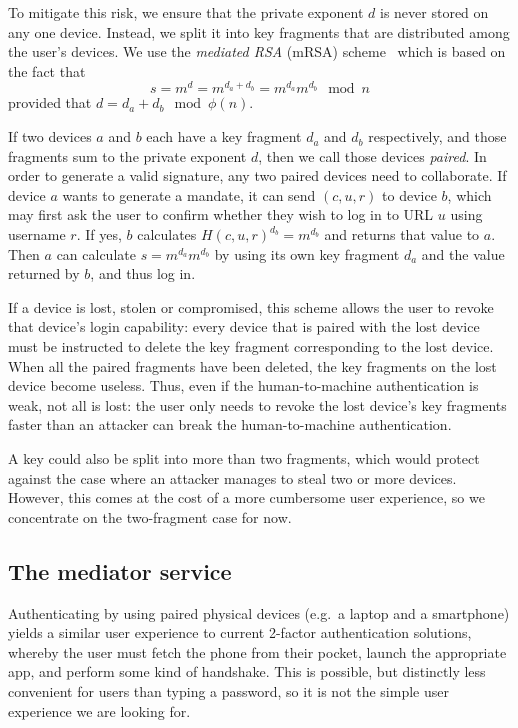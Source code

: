 To mitigate this risk, we ensure that the private exponent $d$ is never stored on any one device.
Instead, we split it into key fragments that are distributed among the user's devices. We use the
\emph{mediated RSA} (mRSA) scheme~\cite{Boneh01, Kutyiowski12} which is based on the fact that
$$s = m^d = m^{d_a + d_b} = m^{d_a} m^{d_b} \mod n$$ provided that $d = d_a + d_b \mod \phi(n)$.

If two devices $a$ and $b$ each have a key fragment $d_a$ and $d_b$ respectively, and those
fragments sum to the private exponent $d$, then we call those devices \emph{paired}. In order to
generate a valid signature, any two paired devices need to collaborate. If device $a$ wants to
generate a mandate, it can send $(c, u, r)$ to device $b$, which may first ask the user to confirm
whether they wish to log in to URL $u$ using username $r$. If yes, $b$ calculates
$H(c, u, r)^{d_b} = m^{d_b}$ and returns that value to $a$. Then $a$ can calculate
$s = m^{d_a} m^{d_b}$ by using its own key fragment $d_a$ and the value returned by $b$, and thus
log in.

If a device is lost, stolen or compromised, this scheme allows the user to revoke that device's
login capability: every device that is paired with the lost device must be instructed to delete the
key fragment corresponding to the lost device. When all the paired fragments have been deleted, the
key fragments on the lost device become useless. Thus, even if the human-to-machine authentication
is weak, not all is lost: the user only needs to revoke the lost device's key fragments faster than
an attacker can break the human-to-machine authentication.

A key could also be split into more than two fragments, which would protect against the case where
an attacker manages to steal two or more devices. However, this comes at the cost of a more
cumbersome user experience, so we concentrate on the two-fragment case for now.

\subsection{The mediator service}\label{sec:mediator}

Authenticating by using paired physical devices (e.g.\ a laptop and a smartphone) yields a similar
user experience to current 2-factor authentication solutions, whereby the user must fetch the phone
from their pocket, launch the appropriate app, and perform some kind of handshake. This is
possible, but distinctly less convenient for users than typing a password, so it is not the simple
user experience we are looking for.

